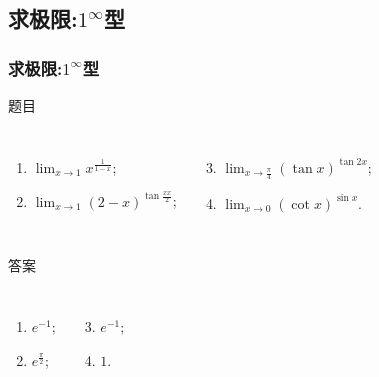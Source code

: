 \documentclass[
10pt,
aspectratio=43,
]{beamer}
\begin{document}
\subsection{求极限:$\displaystyle1^\infty$型}
\begin{frame}
	\frametitle{求极限:$\displaystyle1^\infty$型}
	\everymath{\displaystyle}
	\begin{block}{题目}
		\begin{columns}[onlytextwidth]
			\begin{enumerate}
				\item $\lim _{x \rightarrow 1} x^{\frac{1}{1-x}}$;
				\item $\lim _{x \rightarrow 1}(2-x)^{\tan \frac{x x}{2}}$;
			\end{enumerate}
			\begin{enumerate}
				\setcounter{enumi}{2}
				\item $\lim _{x \rightarrow \frac{\pi}{4}}(\tan x)^{\tan 2 x}$;
				\item $\lim _{x \rightarrow 0}(\cot x)^{\sin x}$.
			\end{enumerate}
		\end{columns}
	\end{block}

	\begin{exampleblock}{答案}
		\begin{columns}[onlytextwidth]
			\begin{enumerate}
				\pause
				\item $e^{-1}$;
				\item $e^{\frac{\pi}{2}}$;
			\end{enumerate}
			\begin{enumerate}
				\setcounter{enumi}{2}
				\pause
				\item $e^{-1}$;
				\item $1$.
			\end{enumerate}
		\end{columns}
	\end{exampleblock}

\end{frame}
\end{document}
